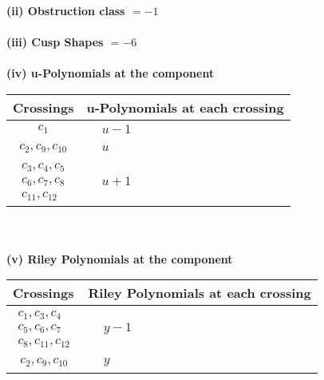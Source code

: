 \documentclass[1p]{elsarticle_modified}
\theoremstyle{definition}
\begin{document}
\flushleft \textbf{(ii) Obstruction class $= -1$}\\~\\
\flushleft \textbf{(iii) Cusp Shapes $= -6$}\\~\\
\newpage\renewcommand{\arraystretch}{1}
\flushleft \textbf{(iv) u-Polynomials at the component}\newline \\
\begin{tabular}{m{50pt}|m{274pt}}
Crossings & \hspace{64pt}u-Polynomials at each crossing \\
\hline $$\begin{aligned}c_{1}\end{aligned}$$&$\begin{aligned}
&u-1
\end{aligned}$\\
\hline $$\begin{aligned}c_{2},c_{9},c_{10}\end{aligned}$$&$\begin{aligned}
&u
\end{aligned}$\\
\hline $$\begin{aligned}c_{3},c_{4},c_{5}\\c_{6},c_{7},c_{8}\\c_{11},c_{12}\end{aligned}$$&$\begin{aligned}
&u+1
\end{aligned}$\\
\hline
\end{tabular}\\~\\
\newpage\renewcommand{\arraystretch}{1}
\flushleft \textbf{(v) Riley Polynomials at the component}\newline \\
\begin{tabular}{m{50pt}|m{274pt}}
Crossings & \hspace{64pt}Riley Polynomials at each crossing \\
\hline $$\begin{aligned}c_{1},c_{3},c_{4}\\c_{5},c_{6},c_{7}\\c_{8},c_{11},c_{12}\end{aligned}$$&$\begin{aligned}
&y-1
\end{aligned}$\\
\hline $$\begin{aligned}c_{2},c_{9},c_{10}\end{aligned}$$&$\begin{aligned}
&y
\end{aligned}$\\
\hline
\end{tabular}\\~\\
\end{document}
